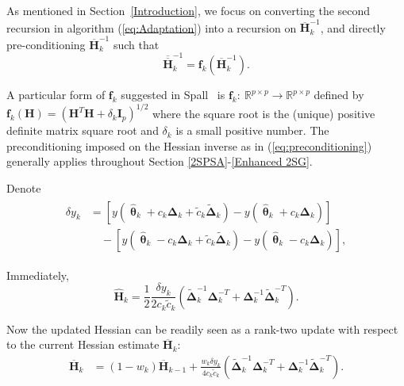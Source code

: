 \documentclass[conference,10.3cpt]{IEEEtran}
\newcommand{\bDelta}{\bm{\Delta}}
\newcommand{\oH}{\bm{\overline{H}}}
\newcommand{\ooH}{\bm{\overline{\overline{H}}}}
\newcommand{\hH}{\bm{\hat{H}}}
\newcommand{\htheta}{\bm{\hat{\uptheta}}}
\newcommand{\tDelta}{\bm{\tilde{\Delta}}}
\begin{document}
As mentioned in Section~\ref{Introduction}, we focus on
converting the second recursion in algorithm (\ref{eq:Adaptation})
into a recursion on $\oH_k^{-1}$, and directly pre-conditioning $\oH_k^{-1}$ such that
\begin{equation} \label{eq:preconditioning}
  \bm{\ooH}_k^{-1}=\bm{f}_k(\oH_k^{-1}).
\end{equation}

A particular form of $\bm{f}_k$ suggested in
Spall~\cite{Spall2009} is $\bm{f}_k:~\mathbb{R}^{p\times p} \to \mathbb{R}^{p\times p}$ defined by
$\bm{f}_k(\bm{H})=(\bm{H}^{T}\bm{H}+\delta_k \bm{I}_p)^{1/2}$ where
the square root is the (unique) positive definite matrix square root and
$\delta_k$ is a small positive number. The preconditioning imposed on
the Hessian inverse as in (\ref{eq:preconditioning}) generally applies
throughout Section \ref{2SPSA}-\ref{Enhanced 2SG}.

Denote
\begin{align} \label{eq:dy}
  \begin{split} \delta
    y_k&=[y(\htheta_k+c_k\bDelta_k+\tilde{c}_k\tDelta_k)-y(\htheta_k+c_k\bDelta_k)]\\
    &\quad-[y(\htheta_k-c_k\bDelta_k+\tilde{c}_k\tDelta_k)-y(\htheta_k-c_k\bDelta_k)],
  \end{split}
\end{align}

Immediately,
\begin{equation} \label{eq:HHat}
   \hH_k=\frac{1}{2}\frac{\delta y_k}{2c_k\tilde{c}_k}\left(
    \tDelta_k^{-1}\bDelta_k^{-T}+\bDelta_k^{-1}\tDelta_k^{-T} \right).
\end{equation}

Now the updated Hessian can be readily seen as a rank-two
update with respect to the current Hessian estimate $\oH_k$:
\begin{align*}
\oH_k &= (1 - w_k)\oH_{k-1} + \frac{w_k \delta y_k}{4c_k\tilde{c}_k} (\tDelta_k^{-1}\bDelta_k^{-T}+\bDelta_k^{-1}\tDelta_k^{-T}).
\end{align*}
\end{document}
